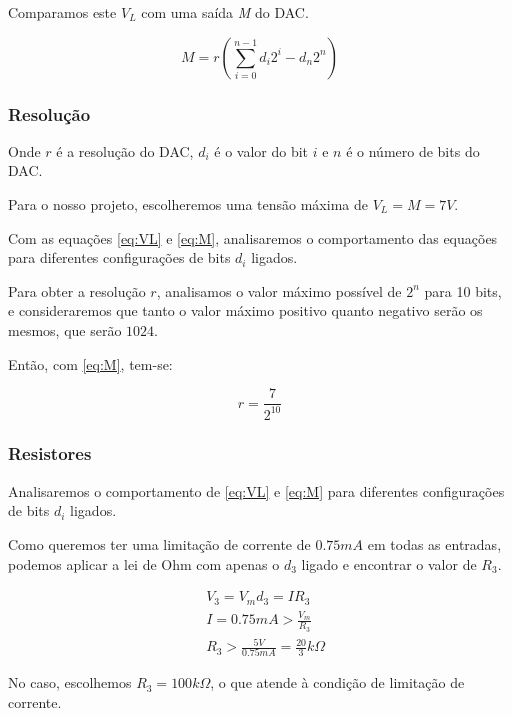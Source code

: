 Comparamos este $V_L$ com uma saída \emph{M} do DAC.

\begin{equation}
    \label{eq:M}
    M = r\left(\sum_{i=0}^{n-1} d_i 2^{i} - d_n 2^n\right)
\end{equation}

\subsubsection{Resolução}

Onde $r$ é a resolução do DAC, $d_i$ é o valor do bit $i$ e $n$ é o número de bits do DAC.

Para o nosso projeto, escolheremos uma tensão máxima de $V_L = M = 7V$.

Com as equações \ref{eq:VL} e \ref{eq:M}, analisaremos o comportamento das equações para diferentes configurações de bits $d_i$ ligados.

Para obter a resolução $r$, analisamos o valor máximo possível de $2^n$ para 10 bits, e consideraremos que tanto o valor máximo positivo quanto negativo serão os mesmos, que serão $1024$.

Então, com \ref{eq:M}, tem-se:

\begin{equation}
    r = \frac{7}{2^{10}}
\end{equation}

\subsubsection{Resistores}

Analisaremos o comportamento de \ref{eq:VL} e \ref{eq:M} para diferentes configurações de bits $d_i$ ligados.

Como queremos ter uma limitação de corrente de $0.75mA$ em todas as entradas, podemos aplicar a lei de Ohm com apenas o $d_3$ ligado e encontrar o valor de $R_3$.


\begin{equation}
    \begin{aligned}
         & V_3 = V_m d_3 = I R_3                               \\
         & I = 0.75mA > \frac{V_m}{R_3}                        \\
         & R_3 > \frac{5V}{ 0.75mA} = \frac{20}{3} k \varOmega
    \end{aligned}
\end{equation}

No caso, escolhemos $R_3 = 100k \Omega$, o que atende à condição de limitação de corrente.


